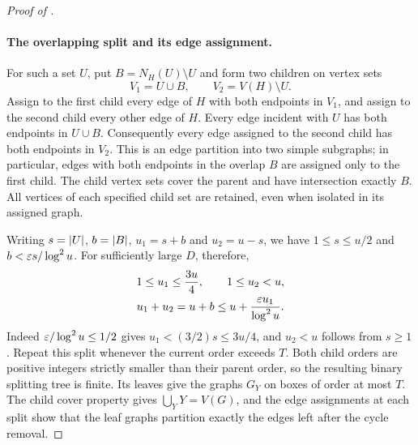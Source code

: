 \begin{proof}[Proof of ]
\paragraph{The overlapping split and its edge assignment.}
For such a set $U$, put $B=N_H(U)\setminus U$ and form two children
on vertex sets
\[
  V_1=U\cup B,\qquad V_2=V(H)\setminus U.
\]
Assign to the first child every edge of $H$ with both endpoints in
$V_1$, and assign to the second child every other edge of $H$.
Every edge incident with $U$ has both endpoints in $U\cup B$.
Consequently every edge assigned to the second child has both endpoints
in $V_2$.  This is an edge partition into two simple subgraphs; in
particular, edges with both endpoints in the overlap $B$ are assigned
only to the first child.  The child vertex sets cover the parent and
have intersection exactly $B$.  All vertices of each specified child
set are retained, even when isolated in its assigned graph.

Writing $s=\left|U\right|$, $b=\left|B\right|$, $u_1=s+b$ and $u_2=u-s$, we have
$1\le s\le u/2$ and $b<\varepsilon s/\log^2u$.  For sufficiently large
$D$, therefore,
\begin{equation}\label{eq:split-child-orders}
\begin{gathered}
  1\le u_1\le\frac{3u}{4},\qquad 1\le u_2<u,\\
  u_1+u_2=u+b
      \le u+\frac{\varepsilon u_1}{\log^2u}.
\end{gathered}
\end{equation}
Indeed $\varepsilon/\log^2u\le1/2$ gives
$u_1<(3/2)s\le3u/4$, and $u_2<u$ follows from $s\ge1$.
Repeat this split whenever the current order exceeds $T$.
Both child orders are positive integers strictly smaller than their
parent order, so the resulting binary splitting tree is finite.
Its leaves give the graphs $G_Y$ on boxes of order at most $T$.
The child cover property gives $\bigcup_Y Y=V(G)$, and the edge
assignments at each split show that the leaf graphs partition exactly
the edges left after the cycle removal.


\end{proof}
